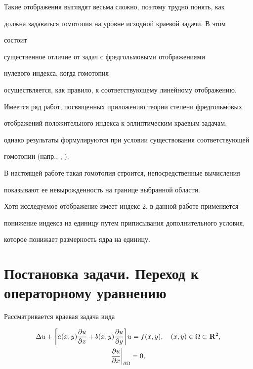 Такие отображения выглядят весьма сложно, поэтому трудно понять, как


должна задаваться гомотопия на уровне исходной краевой задачи. В этом


состоит


существенное отличие от задач с фредгольмовыми отображениями 


нулевого индекса, когда гомотопия


осуществляется, как правило, к соответствующему линейному отображению.





Имеется ряд работ, посвященных приложению теории степени фредгольмовых


отображений положительного индекса к эллиптическим краевым задачам,


однако результаты формулируются при условии существования соответствующей


гомотопии (напр., \cite{nirenberg1}, \cite{nir0}).


В настоящей работе такая гомотопия строится, непосредственные вычисления


показывают ее невырожденность на границе выбранной области.





Хотя исследуемое отображение имеет индекс 2, в данной работе применяется 


понижение индекса на единицу путем приписывания дополнительного условия, 


которое понижает размерность ядра на единицу. 





\section{Постановка задачи. Переход к операторному уравнению}





Рассматривается краевая задача вида 


\begin{gather}


\label{1}


\Delta u+


\bigg[a(x,y)\frac{\partial u}{\partial x}+b(x,y)


\frac{\partial u}{\partial y}\bigg]u


=f(x,y),\quad (x,y) \in \Omega \subset {\bold R^2}, \\


%


\label{2}


\frac{\partial u}{\partial x}\bigg|_{\partial \Omega } =0,


\end{gather}


